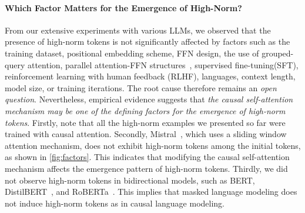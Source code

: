 \paragraph{Which Factor Matters for the Emergence of High-Norm?}

From our extensive experiments with various LLMs,
we observed that the presence of high-norm tokens is not significantly affected by factors such as the training dataset, positional embedding scheme, FFN design, the use of grouped-query attention, parallel attention-FFN structures~\cite{wang2022gpt}, supervised fine-tuning(SFT), reinforcement learning with human feedback (RLHF), languages, context length, model size, or training iterations.
The root cause therefore remains an \emph{open question}.
Nevertheless, empirical evidence suggests that \emph{the causal self-attention mechanism may be one of the defining factors for the emergence of high-norm tokens}.
Firstly, note that all the high-norm examples we presented so far were trained with causal attention.
Secondly, Mistral~\cite{jiang2023mistral7b}, which uses a sliding window attention mechanism, does not exhibit high-norm tokens among the initial tokens, as shown in \cref{fig:factors}.
This indicates that modifying the causal self-attention mechanism affects the emergence pattern of high-norm tokens.
Thirdly, we did not observe high-norm tokens in bidirectional models, such as BERT, DistilBERT~\cite{sanh2019distilbert}, and RoBERTa~\cite{liu2019roberta}.
This implies that masked language modeling
does not induce high-norm tokens as in causal language modeling.
